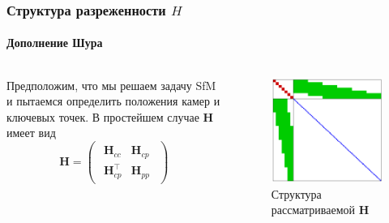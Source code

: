 \documentclass[notheorems,aspectratio=169]{beamer}
\begin{document}
\begin{frame}
  \frametitle{Структура разреженности $H$}
  \framesubtitle{Дополнение Шура}
  \begin{columns}
    \begin{column}{0.5\textwidth}
      Предположим, что мы решаем задачу SfM и пытаемся определить положения камер и ключевых точек. В простейшем случае $\mathbf{H}$ имеет вид
      $$
      \mathbf{H}=
      \begin{pmatrix}
        \begin{array}{c|c}
          \mathbf{H}_{cc} & \mathbf{H}_{cp} \\
          \hline
          \mathbf{H}_{cp}^\intercal & \mathbf{H}_{pp}
        \end{array}
      \end{pmatrix}
      $$

    \end{column}
    \begin{column}{0.5\textwidth}
      \begin{figure}
        \includegraphics[height=0.7\textheight, keepaspectratio]{h-struct-easy.png}
        \caption*{Структура рассматриваемой $\mathbf{H}$}
      \end{figure}
    \end{column}
  \end{columns}
\end{frame}
\end{document}
